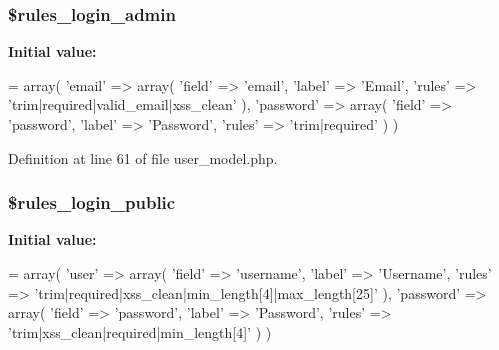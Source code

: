 \hypertarget{class_user__model_ad7c8625130f74e93047c9a368cea42b0}{
\subsubsection[{\$rules\-\_\-login\-\_\-admin}]{\setlength{\rightskip}{0pt plus 5cm}\$rules\-\_\-login\-\_\-admin}}\label{class_user__model_ad7c8625130f74e93047c9a368cea42b0}
{\bfseries Initial value\-:}
\begin{DoxyCode}
= array(
        \textcolor{stringliteral}{'email'} => array(
            \textcolor{stringliteral}{'field'} => \textcolor{stringliteral}{'email'}, 
            \textcolor{stringliteral}{'label'} => \textcolor{stringliteral}{'Email'}, 
            \textcolor{stringliteral}{'rules'} => \textcolor{stringliteral}{'trim|required|valid\_email|xss\_clean'}
        ), 
        \textcolor{stringliteral}{'password'} => array(
            \textcolor{stringliteral}{'field'} => \textcolor{stringliteral}{'password'}, 
            \textcolor{stringliteral}{'label'} => \textcolor{stringliteral}{'Password'}, 
            \textcolor{stringliteral}{'rules'} => \textcolor{stringliteral}{'trim|required'}
        )
    )
\end{DoxyCode}


Definition at line 61 of file user\-\_\-model.\-php.

\hypertarget{class_user__model_af7b4f78bd5365476e9ae516a51b34581}{
\subsubsection[{\$rules\-\_\-login\-\_\-public}]{\setlength{\rightskip}{0pt plus 5cm}\$rules\-\_\-login\-\_\-public}}\label{class_user__model_af7b4f78bd5365476e9ae516a51b34581}
{\bfseries Initial value\-:}
\begin{DoxyCode}
= array(
        \textcolor{stringliteral}{'user'} => array(
            \textcolor{stringliteral}{'field'} => \textcolor{stringliteral}{'username'}, 
            \textcolor{stringliteral}{'label'} => \textcolor{stringliteral}{'Username'}, 
            \textcolor{stringliteral}{'rules'} => \textcolor{stringliteral}{'trim|required|xss\_clean|min\_length[4]|max\_length[25]'}
        ), 
        \textcolor{stringliteral}{'password'} => array(
            \textcolor{stringliteral}{'field'} => \textcolor{stringliteral}{'password'}, 
            \textcolor{stringliteral}{'label'} => \textcolor{stringliteral}{'Password'}, 
            \textcolor{stringliteral}{'rules'} => \textcolor{stringliteral}{'trim|xss\_clean|required|min\_length[4]'}
        )
    )
\end{DoxyCode}


